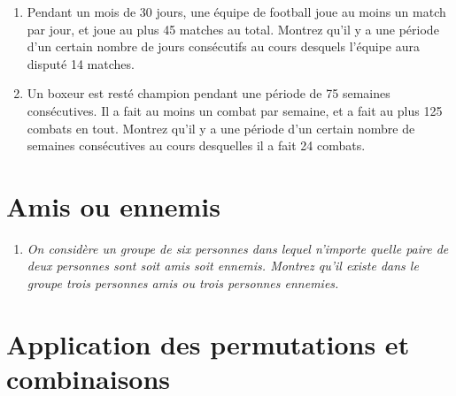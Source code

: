 \documentclass[a4paper,11pt]{article}
\begin{document}
\begin{enumerate}
\item Pendant un mois de 30 jours, une équipe de football joue au moins un match par jour, et joue au plus 45 matches au total. Montrez qu'il y a une période d'un certain nombre de jours consécutifs au cours desquels l'équipe aura disputé 14 matches.

\item Un boxeur est resté champion pendant une période de 75 semaines consécutives. Il a fait au moins un combat par semaine, et a fait au plus 125 combats en tout. Montrez qu'il y a une période d'un certain nombre de semaines consécutives au cours desquelles il a fait 24 combats.
\end{enumerate}

\section{Amis ou ennemis}

\begin{enumerate}
\item \emph{On considère un groupe de six personnes dans lequel n'importe quelle paire de deux personnes sont soit amis soit ennemis. Montrez qu'il existe dans le groupe trois personnes amis ou trois personnes ennemies.}
\end{enumerate}

\section{Application des permutations et combinaisons}
\end{document}
